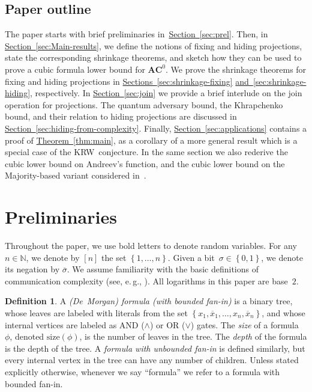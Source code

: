 \documentclass[11pt]{article}
\numberwithin{equation}{section}
\theoremstyle{definition}
\newtheorem{definition}[theorem]{Definition}
\theoremstyle{plain}
\newcommand{\N}{\mathbb N}
\newcommand{\eg}{e.\,g.}
\newcommand{\expref}[2]{\hyperref[#2]{#1~\ref{#2}}}
\theoremstyle{definition}\newtheorem{notation}[theorem]{Notation}\theoremstyle{plain}
\renewcommand{\N}{\mathbb{N}}
\newcommand{\B}{\left\{ 0,1 \right \}}
\newcommand{\ACz}{\boldsymbol{AC}^{0}}
\newcommand{\s}{\mathrm{size}}
\theoremstyle{definition}
\theoremstyle{plain}
\begin{document}
%
\subsection{Paper outline}   %

The paper starts with brief preliminaries in~\expref{Section}{sec:prel}. Then,
in \expref{Section}{sec:Main-results}, we define the notions of fixing and hiding
projections, state the corresponding shrinkage theorems, and sketch
how they can be used to prove a cubic formula lower bound for $\ACz$.
We prove the shrinkage theorems for fixing and hiding projections in
\expref{Sections}{sec:shrinkage-fixing} 
\expref{and}{sec:shrinkage-hiding}, %
 respectively.
In \expref{Section}{sec:join} we provide a brief interlude on the join operation
for projections. The quantum adversary bound, the Khrapchenko bound,
and their relation to hiding projections are discussed in \expref{Section}{sec:hiding-from-complexity}.
Finally, \expref{Section}{sec:applications} contains a proof of \expref{Theorem}{thm:main},
as a corollary of a more general result which is a special case of
the KRW~conjecture. In the same section we also rederive the cubic
lower bound on Andreev's function, and the cubic lower bound on the
Majority-based variant considered in~\cite{GTN19}.

\section{\label{sec:prel}Preliminaries}

Throughout the paper, we use bold letters to denote random variables.
For any $n\in\N$, we denote by $\left[n\right]$ the set $\left\{ 1,\ldots,n\right\} $.
Given a bit~$\sigma\in\B$, we denote its negation by $\overline{\sigma}$.
We assume familiarity with the basic definitions of communication
complexity (see, \eg, \cite{KN_book}). All logarithms in this paper
are base~$2$. 
\begin{definition}
A \emph{(De~Morgan) formula (with bounded fan-in)} is a binary tree,
whose leaves are labeled with literals from the set $\left\{ x_{1},\overline{x}_{1},\ldots,x_{n},\overline{x}_{n}\right\} $,
and whose internal vertices are labeled as AND ($\wedge$) or OR ($\vee$)
gates. The \emph{size} of a formula~$\phi$, denoted $\s(\phi)$,
is the number of leaves in the tree. The \emph{depth} of the formula
is the depth of the tree. A \emph{formula with unbounded fan-in} is
defined similarly, but every internal vertex in the tree can have
any number of children. Unless stated explicitly otherwise, whenever
we say ``formula'' we refer to a formula with bounded fan-in. 
\end{definition}
\end{document}
